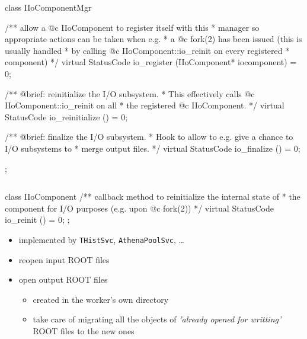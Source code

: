 \documentclass[9pt]{beamer}
\begin{document}
\begin{frame}[fragile]{}

  \begin{columns}
    \begin{column}{0.95\textwidth}

\begin{C++}
class IIoComponentMgr 
{
  /** allow a @c IIoComponent to register itself with this
   *  manager so appropriate actions can be taken when e.g.
   *  a @c fork(2) has been issued (this is usually handled
   *  by calling @c IIoComponent::io_reinit on every registered
   *  component)
   */
  virtual
  StatusCode io_register (IIoComponent* iocomponent) = 0;
  
  /** @brief: reinitialize the I/O subsystem.
   *  This effectively calls @c IIoComponent::io_reinit on all 
   *  the registered @c IIoComponent.
   */
  virtual
  StatusCode io_reinitialize () = 0;

  /** @brief: finalize the I/O subsystem.
   *  Hook to allow to e.g. give a chance to I/O subsystems to 
   *  merge output files.
   */
  virtual
  StatusCode io_finalize () = 0;
};
\end{C++}

    \end{column}
  \end{columns}
\end{frame}

\begin{frame}[fragile]{}

  \begin{columns}
    \begin{column}{0.95\textwidth}

\begin{C++}
class IIoComponent
{
  /** callback method to reinitialize the internal state of
   *  the component for I/O purposes (e.g. upon @c fork(2))
   */
  virtual
  StatusCode io_reinit () = 0;
};
\end{C++}

\begin{block}{}
\begin{itemize}
  \item implemented by \texttt{THistSvc}, \texttt{AthenaPoolSvc}, \ldots
  \item reopen input ROOT files
  \item open output ROOT files
    \begin{itemize}
      \item created in the worker's own directory
      \item take care of migrating all the objects of \emph{'already opened for writting'} ROOT files to the new ones
    \end{itemize}
\end{itemize}
\end{block}

    \end{column}
  \end{columns}
\end{frame}
\end{document}
